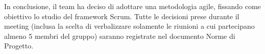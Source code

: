 \vspace{0.5\baselineskip}
In conclusione, il team ha deciso di adottare una metodologia agile, fissando come obiettivo lo studio del framework Scrum. Tutte le decisioni prese durante il meeting (inclusa la scelta di verbalizzare solamente le riunioni a cui partecipano almeno 5 membri del gruppo) saranno registrate nel documento Norme di Progetto.
\clearpage
